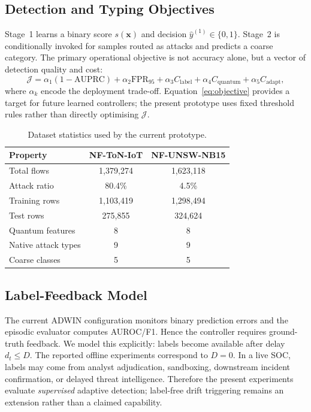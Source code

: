 \documentclass[conference]{IEEEtran}
\begin{document}
\subsection{Detection and Typing Objectives}

Stage~1 learns a binary score $s(\mathbf{x})$ and decision
$\hat{y}^{(1)} \in \{0,1\}$. Stage~2 is conditionally invoked for samples
routed as attacks and predicts a coarse category. The primary operational
objective is not accuracy alone, but a vector of detection quality and
cost:
\begin{equation}
\mathcal{J} = \alpha_1(1-\text{AUPRC}) + \alpha_2 \text{FPR}_{95} +
\alpha_3 C_{\text{label}} + \alpha_4 C_{\text{quantum}} + \alpha_5
C_{\text{adapt}},
\label{eq:objective}
\end{equation}
where $\alpha_k$ encode the deployment trade-off. Equation~\eqref{eq:objective}
provides a target for future learned controllers; the present prototype
uses fixed threshold rules rather than directly optimising $\mathcal{J}$.

\begin{table}[t]
\centering
\caption{Dataset statistics used by the current prototype.}
\label{tab:datasets}
\renewcommand{\arraystretch}{1.1}
\begin{tabular}{@{}lcc@{}}
\toprule
\textbf{Property} & \textbf{NF-ToN-IoT} & \textbf{NF-UNSW-NB15} \\
\midrule
Total flows          & 1,379,274 & 1,623,118 \\
Attack ratio          & 80.4\%    & 4.5\%     \\
Training rows         & 1,103,419 & 1,298,494 \\
Test rows             & 275,855   & 324,624   \\
Quantum features       & 8         & 8         \\
Native attack types    & 9         & 9         \\
Coarse classes         & 5         & 5         \\
\bottomrule
\end{tabular}
\end{table}

\subsection{Label-Feedback Model}

The current ADWIN configuration monitors binary prediction errors and the
episodic evaluator computes AUROC/F1. Hence the controller requires
ground-truth feedback. We model this explicitly: labels become available
after delay $d_t \leq D$. The reported offline experiments correspond to
$D=0$. In a live SOC, labels may come from analyst adjudication,
sandboxing, downstream incident confirmation, or delayed threat
intelligence. Therefore the present experiments evaluate
\emph{supervised} adaptive detection; label-free drift triggering remains
an extension rather than a claimed capability.
\end{document}
